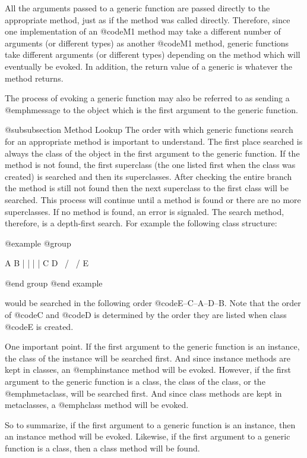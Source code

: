All the arguments passed to a generic function are passed directly to
the appropriate method, just as if the method was called directly.
Therefore, since one implementation of an @code{M1} method may take a
different number of arguments (or different types) as another @code{M1}
method, generic functions take different arguments (or different types)
depending on the method which will eventually be evoked.  In addition,
the return value of a generic is whatever the method returns.

The process of evoking a generic function may also be referred to as
sending a @emph{message} to the object which is the first argument to
the generic function.

@subsubsection Method Lookup
The order with which generic functions search for an appropriate method
is important to understand.  The first place searched is always the
class of the object in the first argument to the generic function.  If
the method is not found, the first superclass (the one listed first when
the class was created) is searched and then its superclasses.  After
checking the entire branch the method is still not found then the next
superclass to the first class will be searched.  This process will
continue until a method is found or there are no more superclasses.  If
no method is found, an error is signaled.  The search method, therefore,
is a depth-first search.  For example the following class structure:

@example
@group

               A     B
               |     |
               |     |
               C     D
                \   /
                 \ /
                  E

@end group
@end example

would be searched in the following order @code{E--C--A--D--B}.  Note that
the order of @code{C} and @code{D} is determined by the order they are
listed when class @code{E} is created.

One important point.  If the first argument to the generic function is
an instance, the class of the instance will be searched first.  And
since instance methods are kept in classes, an @emph{instance} method
will be evoked.  However, if the first argument to the generic function
is a class, the class of the class, or the @emph{metaclass}, will be
searched first.  And since class methods are kept in metaclasses, a
@emph{class} method will be evoked.

So to summarize, if the first argument to a generic function is an
instance, then an instance method will be evoked.  Likewise, if the
first argument to a generic function is a class, then a class method
will be found.

